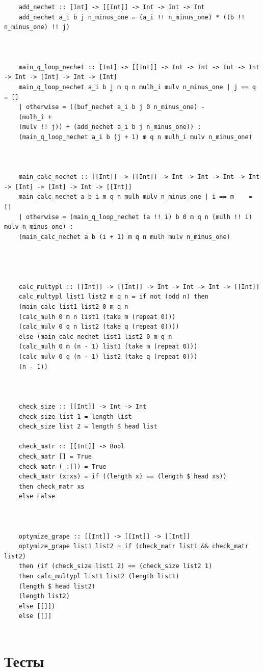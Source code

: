 \documentclass[12pt]{report}
\begin{document}
\begin{lstlisting}[label=some-code3,caption=Оптимизированный алгоритм Виноградова]
	
	
	add_nechet :: [Int] -> [[Int]] -> Int -> Int -> Int
	add_nechet a_i b j n_minus_one = (a_i !! n_minus_one) * ((b !! n_minus_one) !! j)
	
	
	
	main_q_loop_nechet :: [Int] -> [[Int]] -> Int -> Int -> Int -> Int -> Int -> [Int] -> Int -> [Int]
	main_q_loop_nechet a_i b j m q n mulh_i mulv n_minus_one | j == q    = []
	| otherwise = ((buf_nechet a_i b j 0 n_minus_one) - 
	(mulh_i + 
	(mulv !! j)) + (add_nechet a_i b j n_minus_one)) : 
	(main_q_loop_nechet a_i b (j + 1) m q n mulh_i mulv n_minus_one)
	
	
	
	main_calc_nechet :: [[Int]] -> [[Int]] -> Int -> Int -> Int -> Int -> [Int] -> [Int] -> Int -> [[Int]]
	main_calc_nechet a b i m q n mulh mulv n_minus_one | i == m    = []
	| otherwise = (main_q_loop_nechet (a !! i) b 0 m q n (mulh !! i) mulv n_minus_one) : 
	(main_calc_nechet a b (i + 1) m q n mulh mulv n_minus_one)
	
	
	
	
	calc_multypl :: [[Int]] -> [[Int]] -> Int -> Int -> Int -> [[Int]]
	calc_multypl list1 list2 m q n = if not (odd n) then
	(main_calc list1 list2 0 m q n 
	(calc_mulh 0 m n list1 (take m (repeat 0)))
	(calc_mulv 0 q n list2 (take q (repeat 0))))
	else (main_calc_nechet list1 list2 0 m q n 
	(calc_mulh 0 m (n - 1) list1 (take m (repeat 0)))
	(calc_mulv 0 q (n - 1) list2 (take q (repeat 0)))
	(n - 1))
	
	
	
	check_size :: [[Int]] -> Int -> Int
	check_size list 1 = length list
	check_size list 2 = length $ head list
	
	check_matr :: [[Int]] -> Bool
	check_matr [] = True
	check_matr (_:[]) = True
	check_matr (x:xs) = if ((length x) == (length $ head xs)) 
	then check_matr xs
	else False
	
	
	
	optymize_grape :: [[Int]] -> [[Int]] -> [[Int]]
	optymize_grape list1 list2 = if (check_matr list1 && check_matr list2) 
	then (if (check_size list1 2) == (check_size list2 1)
	then calc_multypl list1 list2 (length list1) 
	(length $ head list2) 
	(length list2) 
	else [[]])
	else [[]]
	
	\end{lstlisting}
	
	\section{Тесты}
	
\end{document}
